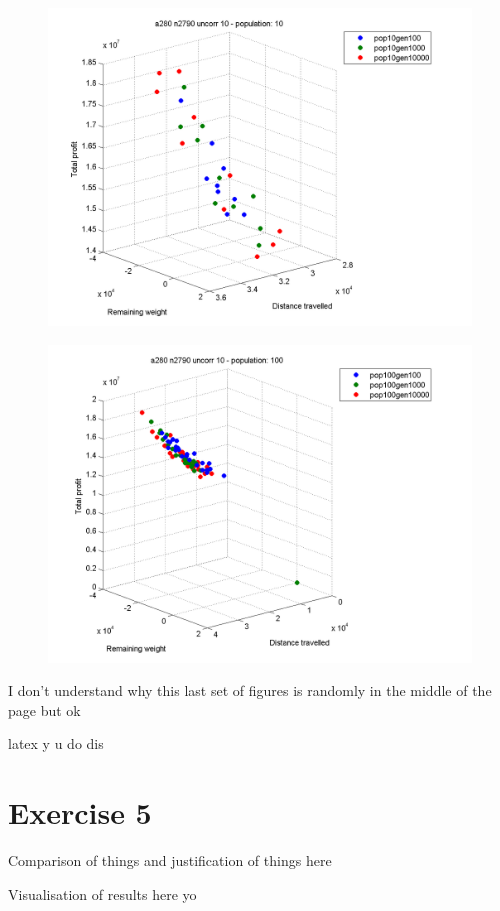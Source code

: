 \documentclass[a4paper,12pt]{article}
\begin{document}
\begin{figure}[h]
\centering
\begin{minipage}{.5\textwidth}
  \centering
  \includegraphics[width=.8\linewidth]{q4graphs/a280_n2790_pop10.png}
  \label{fig:a280279010}
\end{minipage}%
\begin{minipage}{.5\textwidth}
  \centering
  \includegraphics[width=.8\linewidth]{q4graphs/a280_n2790_pop100.png}
  \label{fig:a280279010}
\end{minipage}
\end{figure}

I don't understand why this last set of figures is randomly in the middle of the page but ok

latex y u do dis





\section*{Exercise 5}

Comparison of things and justification of things here

Visualisation of results here yo
\end{document}
